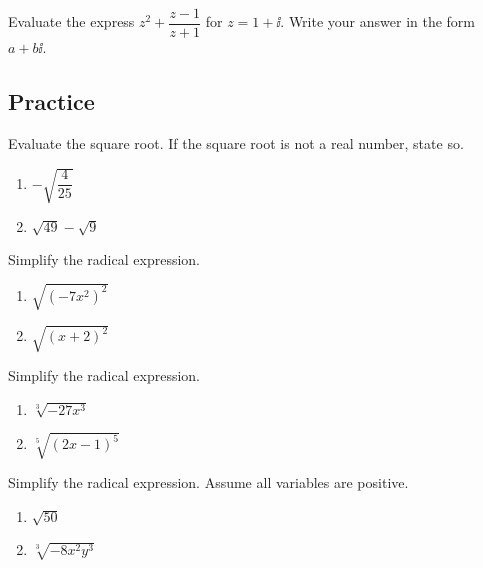 \begin{example}
  Evaluate the express \(z^2+\dfrac{z-1}{z+1}\) for \(z=1+\ii\). Write your
  answer in the form \(a+b\ii\).
\end{example}
\vspace*{4\baselineskip}

\subsection{Practice}

\begin{exercise}
  Evaluate the square root. If the square root is not a real number, state
  so.
  
  \begin{enumerate}
  \item
    \(-\sqrt{\dfrac{4}{25}}\)
  \item
    \(\sqrt{49}-\sqrt{9}\)
  \end{enumerate}
\end{exercise}

\begin{exercise}
  Simplify the radical expression.
  
  \begin{enumerate}
  \item
    \(\sqrt{(-7x^2)^2}\)
  \item
    \(\sqrt{(x+2)^2}\)
  \end{enumerate}
\end{exercise}

\begin{exercise}
  Simplify the radical expression.
  
  \begin{enumerate}
  \item
    \(\sqrt[3]{-27x^3}\)
  \item
    \(\sqrt[5]{(2x-1)^5}\)
  \end{enumerate}
\end{exercise}

\begin{exercise}
  Simplify the radical expression. Assume all variables are positive.
  
  \begin{enumerate}
  \item
    \(\sqrt{50}\)
  \item
    \(\sqrt[3]{-8x^2y^3}\)
  \end{enumerate}
\end{exercise}

